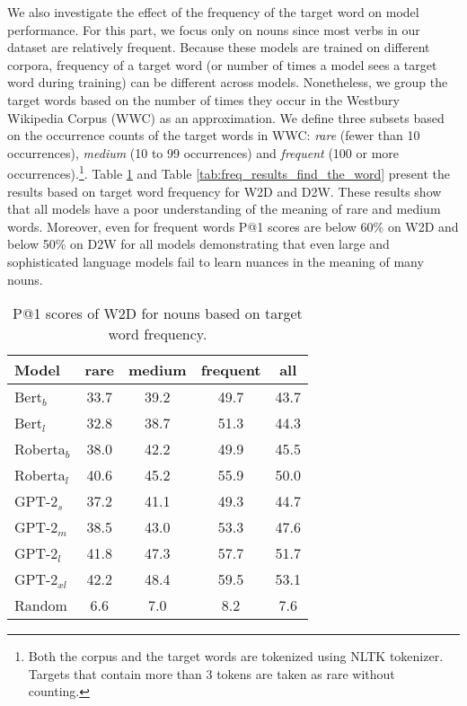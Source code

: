 \documentclass[11pt,a4paper]{article}
\begin{document}
We also investigate the effect of the frequency of the
target word on model performance. For this part, we
focus only on  nouns since most  verbs in our dataset
are relatively frequent. Because these models are trained on
different corpora, frequency of a target word (or number of
times a model sees a target word during training) can be
different across  models. Nonetheless, we group the
target words based on the number of times they occur in the
Westbury Wikipedia Corpus (WWC) \cite{WWC} as an
approximation. We
define three subsets based on the occurrence counts of the
target words in WWC: \textit{rare} (fewer than 10 occurrences),
 \textit{medium} (10 to 99 occurrences) and
 \textit{frequent}
(100 or more occurrences).\footnote{Both the corpus and
  the target words are tokenized using NLTK tokenizer.  Targets
  that contain more than 3 tokens are taken as rare without
  counting.}. Table
\ref{tab:freq_results_find_the_definition} and Table
\ref{tab:freq_results_find_the_word} present the  results
based on target word frequency for
W2D and D2W.
These results show that
all models have a poor understanding of the meaning of 
rare and medium words. Moreover, even for 
frequent words P@1 scores are below 60\% on W2D and below 50\% on D2W for all models demonstrating that even  large and sophisticated language
models fail to learn nuances in the meaning of many
nouns.

\begin{table}
    \centering
    \begin{tabular}{l|cccc}
    \hline
         \textbf{Model} & \textbf{rare} & \textbf{medium} & \textbf{frequent} & \textbf{all} \\ \hline
     Bert$_{b}$ & 33.7 & 39.2 & 49.7 & 43.7 \\
     Bert$_{l}$ & 32.8 & 38.7 & 51.3 & 44.3 \\
     Roberta$_{b}$ & 38.0 & 42.2 & 49.9 & 45.5 \\
     Roberta$_{l}$ & 40.6 & 45.2 & 55.9 & 50.0 \\ \hline
     GPT-2$_{s}$ & 37.2 & 41.1 & 49.3 & 44.7 \\
     GPT-2$_{m}$ & 38.5 & 43.0 & 53.3 & 47.6 \\
     GPT-2$_{l}$ & 41.8 & 47.3 & 57.7 & 51.7 \\
     GPT-2$_{xl}$ & 42.2 & 48.4 & 59.5 & 53.1 \\ \hline
     Random & 6.6 & 7.0 & 8.2 & 7.6 \\ \hline 
     
    \end{tabular}
    \caption{P@1 scores of W2D for nouns based on target word frequency.}
    \label{tab:freq_results_find_the_definition}
\end{table}
\end{document}

